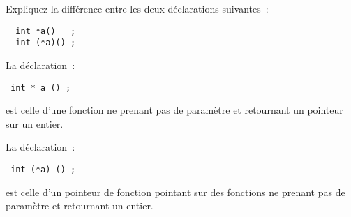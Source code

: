 Expliquez la diff\'erence entre les deux d\'eclarations suivantes~:
\begin{verbatim}
  int *a()   ;
  int (*a)() ;
\end{verbatim}
\ifcorrection%
\begin{correction}
  La d\'eclaration~:
\begin{verbatim}
 int * a () ;
\end{verbatim}
  est celle d'une fonction ne prenant pas de param\`etre et retournant
  un pointeur sur un entier.
  \par
  La d\'eclaration~:
\begin{verbatim}
 int (*a) () ;
\end{verbatim}
  est celle d'un pointeur de fonction pointant sur des fonctions ne
  prenant pas de param\`etre et retournant un entier.
\end{correction}
\fi%